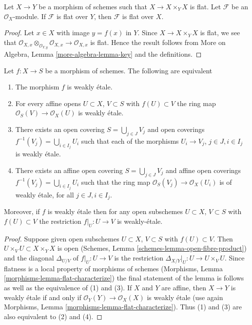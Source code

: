 \begin{lemma}
\label{lemma-key}
Let $X \to Y$ be a morphism of schemes such that
$X \to X \times_Y X$ is flat. Let $\mathcal{F}$ be an $\mathcal{O}_X$-module.
If $\mathcal{F}$ is flat over $Y$, then $\mathcal{F}$ is flat over $X$.
\end{lemma}

\begin{proof}
Let $x \in X$ with image $y = f(x)$ in $Y$.
Since $X \to X \times_Y X$ is flat, we see that
$\mathcal{O}_{X, x} \otimes_{\mathcal{O}_{Y, y}} \mathcal{O}_{X, x} \to
\mathcal{O}_{X, x}$ is flat. Hence the result follows from
More on Algebra, Lemma \ref{more-algebra-lemma-key}
and the definitions.
\end{proof}

\begin{lemma}
\label{lemma-weakly-etale-characterize}
Let $f : X \to S$ be a morphism of schemes. The following are equivalent
\begin{enumerate}
\item The morphism $f$ is weakly \'etale.
\item For every affine opens $U \subset X$, $V \subset S$
with $f(U) \subset V$ the ring map
$\mathcal{O}_S(V) \to \mathcal{O}_X(U)$ is weakly \'etale.
\item There exists an open covering $S = \bigcup_{j \in J} V_j$
and open coverings $f^{-1}(V_j) = \bigcup_{i \in I_j} U_i$ such
that each of the morphisms $U_i \to V_j$, $j\in J, i\in I_j$
is weakly \'etale.
\item There exists an affine open covering $S = \bigcup_{j \in J} V_j$
and affine open coverings $f^{-1}(V_j) = \bigcup_{i \in I_j} U_i$ such
that the ring map $\mathcal{O}_S(V_j) \to \mathcal{O}_X(U_i)$ is
of weakly \'etale, for all $j\in J, i\in I_j$.
\end{enumerate}
Moreover, if $f$ is weakly \'etale then for
any open subschemes $U \subset X$, $V \subset S$ with $f(U) \subset V$
the restriction $f|_U : U \to V$ is weakly-\'etale.
\end{lemma}

\begin{proof}
Suppose given open subschemes $U \subset X$, $V \subset S$ with
$f(U) \subset V$. Then $U \times_V U \subset X \times_Y X$ is open
(Schemes, Lemma \ref{schemes-lemma-open-fibre-product})
and the diagonal $\Delta_{U/V}$ of $f|_U : U \to V$ is
the restriction $\Delta_{X/Y}|_U : U \to U \times_V U$.
Since flatness is a local property of morphisms of schemes
(Morphisms, Lemma \ref{morphisms-lemma-flat-characterize})
the final statement of the lemma is follows
as well as the equivalence of (1) and (3).
If $X$ and $Y$ are affine, then $X \to Y$ is weakly \'etale
if and only if $\mathcal{O}_Y(Y) \to \mathcal{O}_X(X)$ is
weakly \'etale (use again
Morphisms, Lemma \ref{morphisms-lemma-flat-characterize}).
Thus (1) and (3) are also equivalent to (2) and (4).
\end{proof}


